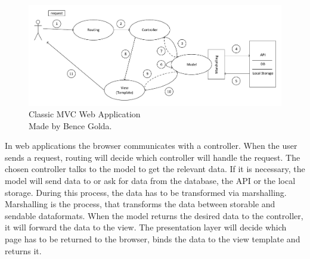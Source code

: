 \begin{figure}[!ht]
	\includegraphics[width=\textwidth]{figures/klasszikus_mvc_webalkalmazas.pdf}
	\caption[Classic MVC Web Application]{Classic MVC Web Application\\Made by Bence Golda.}
	\label{fig:classic-mvc-webapplication}
\end{figure}

In web applications the browser communicates with a controller. When the user sends a request, routing will decide which controller will handle the request. The chosen controller talks to the model to get the relevant data. If it is necessary, the model will send data to or ask for data from the database, the API or the local storage. During this process, the data has to be transformed via marshalling. Marshalling is the process, that transforms the data between storable and sendable dataformats. When the model returns the desired data to the controller, it will forward the data to the view. The presentation layer will decide which page has to be returned to the browser, binds the data to the view template and returns it.



